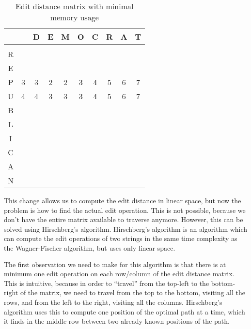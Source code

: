 \begin{table}
	\begin{center}
		\begin{tabular}[c]{c|c|c|c|c|c|c|c|c|c|}
			  &   & D & E & M & O & C & R & A & T \\\hline
			  &   &   &   &   &   &   &   &   &   \\\hline
			R &   &   &   &   &   &   &   &   &   \\\hline
			E &   &   &   &   &   &   &   &   &   \\\hline
			P & 3 & 3 & 2 & 2 & 3 & 4 & 5 & 6 & 7 \\\hline
			U & 4 & 4 & 3 & 3 & 3 & 4 & 5 & 6 & 7 \\\hline
			B &   &   &   &   &   &   &   &   &   \\\hline
			L &   &   &   &   &   &   &   &   &   \\\hline
			I &   &   &   &   &   &   &   &   &   \\\hline
			C &   &   &   &   &   &   &   &   &   \\\hline
			A &   &   &   &   &   &   &   &   &   \\\hline
			N &   &   &   &   &   &   &   &   &   \\\hline
		\end{tabular}
	\end{center}
	\caption{Edit distance matrix with minimal memory usage}
	\label{tab:minimalmemoryusageeditdistance}
\end{table}

This change allows us to compute the edit distance in linear space, but now the problem is
how to find the actual edit operation. This is not possible, because we don't have
the entire matrix available to traverse anymore. However, this can be solved using Hirschberg's
algorithm\cite{HirschbergsAlgorithm}. Hirschberg's algorithm is an algorithm which can
compute the edit operations of two strings in the same time complexity as the
Wagner-Fischer algorithm, but uses only linear space.

The first observation we need to make for this algorithm is that there is at minimum one
edit operation on each row/column of the edit distance matrix. This is intuitive, because
in order to ``travel'' from the top-left to the bottom-right of the matrix, we need to
travel from the top to the bottom, visiting all the rows, and from the left to the right,
visiting all the columns. Hirschberg's algorithm uses this to compute one position of the
optimal path at a time, which it finds in the middle row between two already known
positions of the path.

